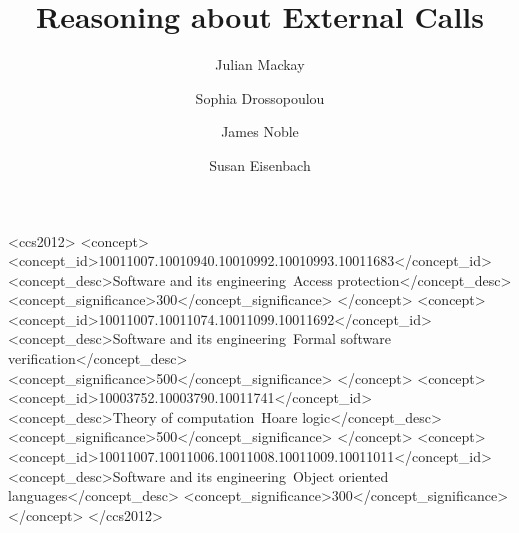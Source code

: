 \documentclass[acmsmall]{acmart}
\begin{document}
\title{Reasoning about External Calls}

\author{Julian Mackay}

\author{Sophia Drossopoulou}

\author{James Noble}

\author{Susan Eisenbach}





  

\begin{CCSXML}
<ccs2012>
   <concept>
       <concept_id>10011007.10010940.10010992.10010993.10011683</concept_id>
       <concept_desc>Software and its engineering~Access protection</concept_desc>
       <concept_significance>300</concept_significance>
       </concept>
   <concept>
       <concept_id>10011007.10011074.10011099.10011692</concept_id>
       <concept_desc>Software and its engineering~Formal software verification</concept_desc>
       <concept_significance>500</concept_significance>
       </concept>
   <concept>
       <concept_id>10003752.10003790.10011741</concept_id>
       <concept_desc>Theory of computation~Hoare logic</concept_desc>
       <concept_significance>500</concept_significance>
       </concept>
   <concept>
       <concept_id>10011007.10011006.10011008.10011009.10011011</concept_id>
       <concept_desc>Software and its engineering~Object oriented languages</concept_desc>
       <concept_significance>300</concept_significance>
       </concept>
 </ccs2012>
\end{CCSXML}
\end{document}
